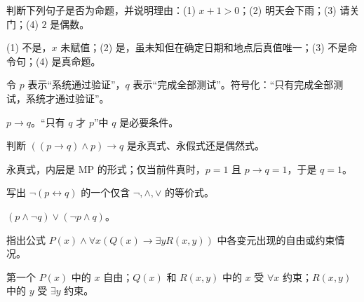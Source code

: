 %
%

\begin{exercise}[level=basic]
判断下列句子是否为命题，并说明理由：\quad (1) $x+1>0$；(2) 明天会下雨；(3) 请关门；(4) $2$ 是偶数。
\begin{solution}
(1) 不是，$x$ 未赋值；(2) 是，虽未知但在确定日期和地点后真值唯一；(3) 不是命令句；(4) 是真命题。
\end{solution}
\end{exercise}

\begin{exercise}[level=basic]
令 $p$ 表示“系统通过验证”，$q$ 表示“完成全部测试”。符号化：“只有完成全部测试，系统才通过验证”。
\begin{solution}
$p\to q$。“只有 $q$ 才 $p$”中 $q$ 是必要条件。
\end{solution}
\end{exercise}

\begin{exercise}[level=basic]
判断 $((p\to q)\land p)\to q$ 是永真式、永假式还是偶然式。
\begin{solution}
永真式，内层是 MP 的形式；仅当前件真时，$p=1$ 且 $p\to q=1$，于是 $q=1$。
\end{solution}
\end{exercise}

\begin{exercise}[level=basic]
写出 $\neg(p\leftrightarrow q)$ 的一个仅含 $\neg,\land,\lor$ 的等价式。
\begin{solution}
$(p\land\neg q)\lor(\neg p\land q)$。
\end{solution}
\end{exercise}

\begin{exercise}[level=basic]
指出公式 $P(x)\land\forall x(Q(x)\to\exists yR(x,y))$ 中各变元出现的自由或约束情况。
\begin{solution}
第一个 $P(x)$ 中的 $x$ 自由；$Q(x)$ 和 $R(x,y)$ 中的 $x$ 受 $\forall x$ 约束；$R(x,y)$ 中的 $y$ 受 $\exists y$ 约束。
\end{solution}
\end{exercise}

